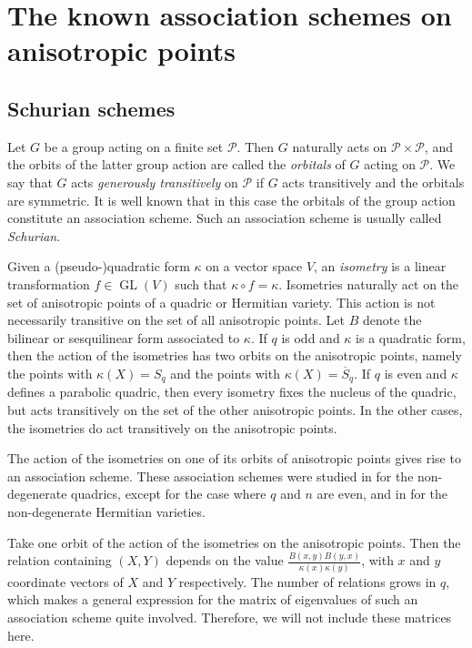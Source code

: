 \documentclass[a4paper]{article}
\theoremstyle{definition}
\newcommand{\pp}{\mathcal P}
\DeclareMathOperator{\GL}{GL}
\newcommand{\ns}{\overline S}
\begin{document}
\section{The known association schemes on anisotropic points}
 \label{Sec:Known}

\subsection{Schurian schemes}
 \label{SubSecSchurianSchemes}

Let $G$ be a group acting on a finite set $\pp$.
Then $G$ naturally acts on $\pp \times \pp$, and the orbits of the latter group action are called the \emph{orbitals} of $G$ acting on $\pp$.
We say that $G$ acts \emph{generously transitively} on $\pp$ if $G$ acts transitively and the orbitals are symmetric.
It is well known that in this case the orbitals of the group action constitute an association scheme.
Such an association scheme is usually called \emph{Schurian}.

Given a (pseudo-)quadratic form $\kappa$ on a vector space $V$, an \emph{isometry} is a linear transformation $f \in \GL(V)$ such that $\kappa \circ f = \kappa$.
Isometries naturally act on the set of anisotropic points of a quadric or Hermitian variety.
This action is not necessarily transitive on the set of all anisotropic points.
Let $B$ denote the bilinear or sesquilinear form associated to $\kappa$.
If $q$ is odd and $\kappa$ is a quadratic form, then the action of the isometries has two orbits on the anisotropic points, namely the points with $\kappa(X) = S_q$ and the points with $\kappa(X) = \ns_q$.
If $q$ is even and $\kappa$ defines a parabolic quadric, then every isometry fixes the nucleus of the quadric, but acts transitively on the set of the other anisotropic points.
In the other cases, the isometries do act transitively on the anisotropic points.

The action of the isometries on one of its orbits of anisotropic points gives rise to an association scheme.
These association schemes were studied in \cite{bannaihaosong} for the non-degenerate quadrics, except for the case where $q$ and $n$ are even, and in \cite{wei83,bannaisonghaowei} for the non-degenerate Hermitian varieties.

Take one orbit of the action of the isometries on the anisotropic points.
Then the relation containing $(X,Y)$ depends on the value $\frac{B(x,y)B(y,x)}{\kappa(x) \kappa(y)}$, with $x$ and $y$ coordinate vectors of $X$ and $Y$ respectively.
The number of relations grows in $q$, which makes a general expression for the matrix of eigenvalues of such an association scheme quite involved.
Therefore, we will not include these matrices here.
\end{document}
